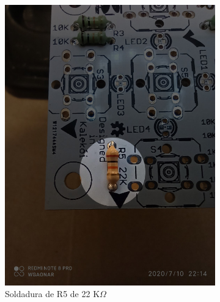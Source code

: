 \documentclass{article}
\begin{document}
\begin{figure}[htbp]
\begin{subfigure}[t]{0.3\textwidth}
        \includegraphics[width=0.9\columnwidth, height=1.2\columnwidth]{images/Botonera/botonera5.jpg}
        \caption{Soldadura de R5 de 22 K$\Omega$}
        \label{fig:botonera_resistencias5}
    \end{subfigure}%
    \begin{subfigure}[t]{0.3\textwidth}
        \centering

\end{subfigure}
\end{figure}
\end{document}
